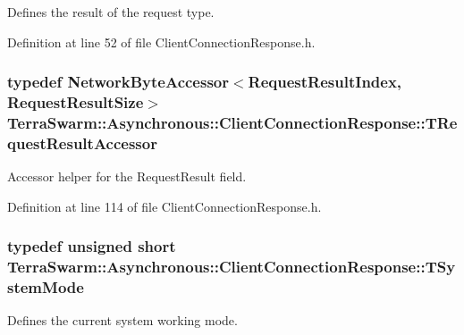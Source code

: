Defines the result of the request type. 



Definition at line 52 of file Client\-Connection\-Response.\-h.

\hypertarget{class_terra_swarm_1_1_asynchronous_1_1_client_connection_response_a43af70d1b67752224dd262c6fdd31a7e}{
\subsubsection[{T\-Request\-Result\-Accessor}]{\setlength{\rightskip}{0pt plus 5cm}typedef {\bf Network\-Byte\-Accessor}$<${\bf Request\-Result\-Index}, {\bf Request\-Result\-Size}$>$ {\bf Terra\-Swarm\-::\-Asynchronous\-::\-Client\-Connection\-Response\-::\-T\-Request\-Result\-Accessor}\hspace{0.3cm}{\ttfamily [private]}}}\label{class_terra_swarm_1_1_asynchronous_1_1_client_connection_response_a43af70d1b67752224dd262c6fdd31a7e}


Accessor helper for the Request\-Result field. 



Definition at line 114 of file Client\-Connection\-Response.\-h.

\hypertarget{class_terra_swarm_1_1_asynchronous_1_1_client_connection_response_ac34facba96c97e6897a1abd5ddd09159}{
\subsubsection[{T\-System\-Mode}]{\setlength{\rightskip}{0pt plus 5cm}typedef unsigned short {\bf Terra\-Swarm\-::\-Asynchronous\-::\-Client\-Connection\-Response\-::\-T\-System\-Mode}}}\label{class_terra_swarm_1_1_asynchronous_1_1_client_connection_response_ac34facba96c97e6897a1abd5ddd09159}


Defines the current system working mode. 




